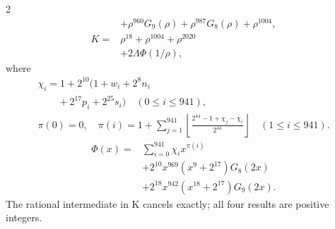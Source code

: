 \documentclass[10pt]{article}
\newcommand{\fl}[1]{\left\lfloor#1\right\rfloor}
\begin{document}
\begin{multicols}{2}
\begin{align*}
&+\rho^{960}G_9(\rho)+\rho^{987}G_8(\rho)
  +\rho^{1004},\\
K={}&\rho^{18}+\rho^{1004}+\rho^{2020}\\
&+2\Lambda\Phi(1/\rho),
\end{align*}
where
\[
\begin{gathered}
\chi_i=1+2^{10}(1+w_i+2^8n_i\\
\qquad+2^{17}p_i+2^{25}s_i)\quad(0\le i\le941),\\
\pi(0)=0,\quad\pi(i)=1+\sum_{j=1}^{941}
\fl{\frac{2^{44}-1+\chi_j-\chi_i}{2^{44}}}\quad(1\le i\le941).
\end{gathered}
\]
\[
\begin{split}
\Phi(x)={}&\sum_{i=0}^{941}\chi_i x^{\pi(i)}\\
&+2^{10}x^{969}(x^9+2^{17})G_8(2x)\\
&+2^{18}x^{942}(x^{18}+2^{17})G_9(2x).
\end{split}
\]
The rational intermediate in K cancels exactly; all four results are positive integers.


\end{multicols}
\end{document}
